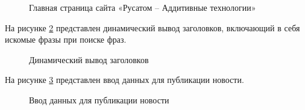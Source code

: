 \begin{figure}[H]
\caption{Главная страница сайта «Русатом – Аддитивные технологии»}
\label{main:image}
\end{figure}

На рисунке \ref{menu:image} представлен динамический вывод заголовков, включающий в себя искомые фразы при поиске фраз.

\begin{figure}[ht!]
\caption{Динамический вывод заголовков}
\label{menu:image}
\end{figure}

На рисунке \ref{enter:image} представлен ввод данных для публикации новости.

\begin{figure}[ht!]
\caption{Ввод данных для публикации новости}
\label{enter:image}
\end{figure}
